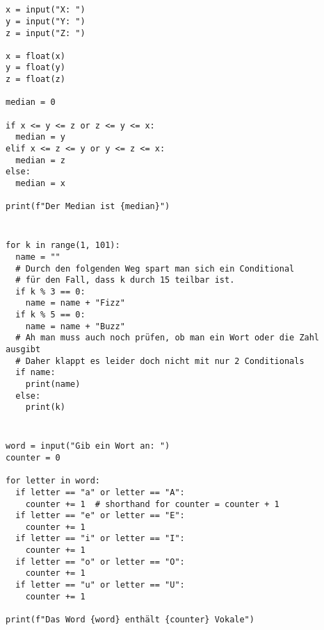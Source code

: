 \documentclass[a4paper]{article}
\begin{document}




\section{}
\begin{verbatim}
x = input("X: ")
y = input("Y: ")
z = input("Z: ")

x = float(x)
y = float(y)
z = float(z)

median = 0

if x <= y <= z or z <= y <= x:
  median = y
elif x <= z <= y or y <= z <= x:
  median = z
else:
  median = x

print(f"Der Median ist {median}")
\end{verbatim}

\section{}
\begin{verbatim}
for k in range(1, 101):
  name = ""
  # Durch den folgenden Weg spart man sich ein Conditional
  # für den Fall, dass k durch 15 teilbar ist.
  if k % 3 == 0:
    name = name + "Fizz"
  if k % 5 == 0:
    name = name + "Buzz"
  # Ah man muss auch noch prüfen, ob man ein Wort oder die Zahl ausgibt
  # Daher klappt es leider doch nicht mit nur 2 Conditionals
  if name:
    print(name)
  else:
    print(k)
\end{verbatim}

\newpage

\section{} 
\begin{verbatim}
word = input("Gib ein Wort an: ")
counter = 0

for letter in word:
  if letter == "a" or letter == "A":
    counter += 1  # shorthand for counter = counter + 1
  if letter == "e" or letter == "E":
    counter += 1
  if letter == "i" or letter == "I":
    counter += 1
  if letter == "o" or letter == "O":
    counter += 1
  if letter == "u" or letter == "U":
    counter += 1

print(f"Das Word {word} enthält {counter} Vokale")
\end{verbatim}
\begin{verbatim}

\end{verbatim}
\end{document}
